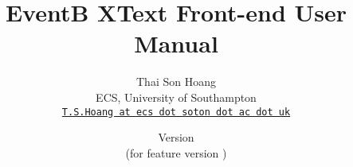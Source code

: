 \documentclass[a4paper,10pt]{article}
\title{EventB XText Front-end User Manual}
\author{%
  Thai Son Hoang\\%
  ECS, University of Southampton\\%
  \texttt{\href{mailto:T.S.Hoang@ecs.soton.ac.uk}{T.S.Hoang at ecs dot soton dot ac dot uk}}%
}%
\date{%
  Version \EventBXTextManualVersion\\%
  (for feature version \EventBXTextFeatureVersion)\\
  \ifplastex
  \EventBXTextManualDate
  \else
  \displaydate{EventBXTextManualDate}%
  \fi
}
\begin{document}
\ifplastex%
\maketitle%
\else%
 \ifstandalone%
 \maketitle %
 \else%
 \fi%
\fi%











%


\end{document}
